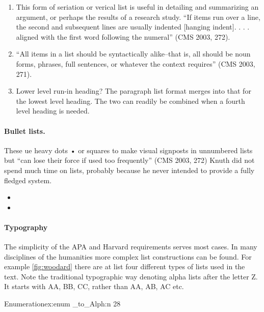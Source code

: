       
\begin{enumerate}
\item This form of seriation or verical list is useful in detailing and summarizing an argument, or perhaps the
results of a research study. \enquote{If items run over a line, the second and subsequent lines are usually
indented [hanging indent]. . . . aligned with the first word following the numeral}  (CMS 2003, 272).

\item \enquote{All items in a list should be syntactically alike--that is, all should be noun forms, phrases, full
sentences, or whatever the context requires} (CMS 2003, 271).

\item Lower level run-in heading? The paragraph list format merges into that for the lowest level
heading. The two can readily be combined when a fourth level heading is needed.
\end{enumerate}

\paragraph{Bullet lists.} These ue heavy dots •  or squares to  make visual signposts in unnumbered lists but ``can lose their force
if used too frequently” (CMS 2003, 272)
Knuth did not spend much time on lists, probably because he never intended to
provide a fully fledged system.

\begin{itemize}
\item \lorem
\item \lorem
      \lorem
\end{itemize}

\paragraph{Typography}

The simplicity of the APA and Harvard requirements serves most cases. In many disciplines of the humanities more complex
list constructions can be found. For example \ref{fig:woodard} there are at list four different types of lists used in the text. Note the traditional typographic way denoting alpha lists after the letter Z. It starts with AA, BB, CC, rather than AA, AB, AC etc. 

\begin{texexample}{Enumeration}{ex:enum}
\ExplSyntaxOn
\int_to_Alph:n {28}
\ExplSyntaxOff
\end{texexample}

